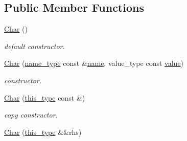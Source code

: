 \subsection*{Public Member Functions}
\begin{DoxyCompactItemize}
\item 
\hypertarget{classhryky_1_1reduction_1_1_char_af409e8668f8a47b44834ad8f67863094}{\hyperlink{classhryky_1_1reduction_1_1_char_af409e8668f8a47b44834ad8f67863094}{Char} ()}\label{classhryky_1_1reduction_1_1_char_af409e8668f8a47b44834ad8f67863094}

\begin{DoxyCompactList}\small\item\em default constructor. \end{DoxyCompactList}\item 
\hypertarget{classhryky_1_1reduction_1_1_char_a590fc3136826c21a6894b4abbd96b0a6}{\hyperlink{classhryky_1_1reduction_1_1_char_a590fc3136826c21a6894b4abbd96b0a6}{Char} (\hyperlink{namespacehryky_1_1reduction_ac686c30a4c8d196bbd0f05629a6b921f}{name\-\_\-type} const \&\hyperlink{classhryky_1_1reduction_1_1_base_a842569265d741905eb8a353d3935f1d1}{name}, value\-\_\-type const \hyperlink{classhryky_1_1reduction_1_1_char_a037af547fcd0e0544ae8b929f94f3b4f}{value})}\label{classhryky_1_1reduction_1_1_char_a590fc3136826c21a6894b4abbd96b0a6}

\begin{DoxyCompactList}\small\item\em constructor. \end{DoxyCompactList}\item 
\hypertarget{classhryky_1_1reduction_1_1_char_a6b0e361b3d417a7b713f781a2c538a82}{\hyperlink{classhryky_1_1reduction_1_1_char_a6b0e361b3d417a7b713f781a2c538a82}{Char} (\hyperlink{classhryky_1_1reduction_1_1_base_af02a7dee6042080b7380afd2f9500a42}{this\-\_\-type} const \&)}\label{classhryky_1_1reduction_1_1_char_a6b0e361b3d417a7b713f781a2c538a82}

\begin{DoxyCompactList}\small\item\em copy constructor. \end{DoxyCompactList}\item 
\hypertarget{classhryky_1_1reduction_1_1_char_a0de2821e571c31b392932704550ee0e2}{\hyperlink{classhryky_1_1reduction_1_1_char_a0de2821e571c31b392932704550ee0e2}{Char} (\hyperlink{classhryky_1_1reduction_1_1_base_af02a7dee6042080b7380afd2f9500a42}{this\-\_\-type} \&\&rhs)}\label{classhryky_1_1reduction_1_1_char_a0de2821e571c31b392932704550ee0e2}


\end{DoxyCompactItemize}

